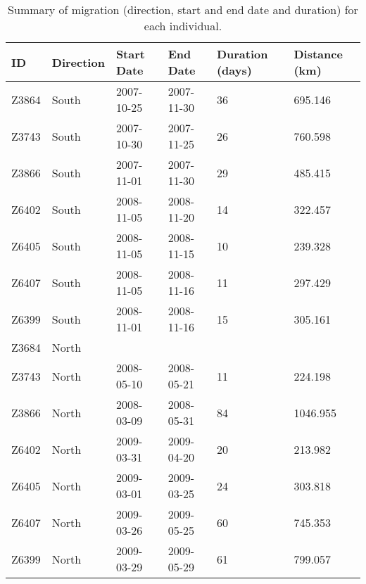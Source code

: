 \begin{table}[H]
\centering
\caption[Migration summary for each individual, Ngamiland]{Summary of migration (direction, start and end date and duration) 
             for each individual.} 
\label{table:summary_migrate_BWA}
\begin{tabular}{llllll}
  \hline
ID & Direction & Start Date & End Date & Duration (days) & Distance (km) \\ 
  \hline
Z3864 & South & 2007-10-25 & 2007-11-30 & 36 & 695.146 \\ 
  Z3743 & South & 2007-10-30 & 2007-11-25 & 26 & 760.598 \\ 
  Z3866 & South & 2007-11-01 & 2007-11-30 & 29 & 485.415 \\ 
  Z6402 & South & 2008-11-05 & 2008-11-20 & 14 & 322.457 \\ 
  Z6405 & South & 2008-11-05 & 2008-11-15 & 10 & 239.328 \\ 
  Z6407 & South & 2008-11-05 & 2008-11-16 & 11 & 297.429 \\ 
  Z6399 & South & 2008-11-01 & 2008-11-16 & 15 & 305.161 \\ 
  Z3684 & North &  &  &  &  \\ 
  Z3743 & North & 2008-05-10 & 2008-05-21 & 11 & 224.198 \\ 
  Z3866 & North & 2008-03-09 & 2008-05-31 & 84 & 1046.955 \\ 
  Z6402 & North & 2009-03-31 & 2009-04-20 & 20 & 213.982 \\ 
  Z6405 & North & 2009-03-01 & 2009-03-25 & 24 & 303.818 \\ 
  Z6407 & North & 2009-03-26 & 2009-05-25 & 60 & 745.353 \\ 
  Z6399 & North & 2009-03-29 & 2009-05-29 & 61 & 799.057 \\ 
   \hline
\end{tabular}
\end{table}

